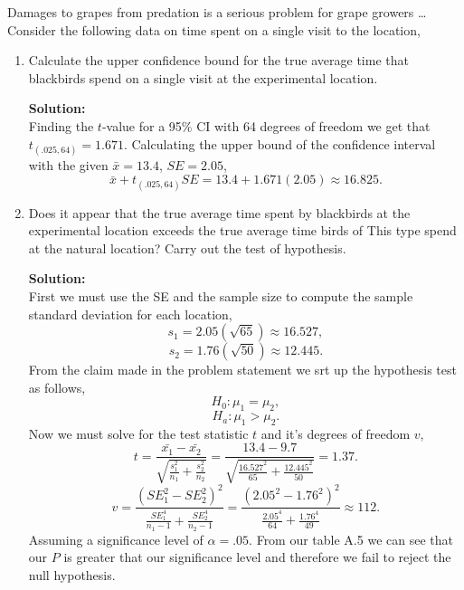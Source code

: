 \documentclass[12pt]{article}
\makeatletter
\theoremstyle{homework}
\newenvironment{exercise}[1]
{\def\@currentlabel{#1}\exercisecore}
{\endexercisecore}
\newcommand{\localhead}[1]{\par\smallskip\noindent\textbf{#1}\nobreak\\}%
\newcommand\solution{\localhead{Solution:}}
\makeatother
\begin{document}
\begin{exercise}{9.24} Damages to grapes from predation is a serious problem for grape growers \dots Consider the 
  following data on time spent on a single visit to the location,\\

  \begin{enumerate}
    \item Calculate the upper confidence bound for the true average time that blackbirds spend on a single visit at the 
    experimental location.\\
    \solution Finding the $t$-value for a 95\% CI with 64 degrees of freedom we get that $t_{(.025, 64)} = 1.671$. Calculating the upper bound of 
    the confidence interval with the given $\bar{x} = 13.4$, $SE = 2.05$,
    \begin{equation*}
      \bar{x} + t_{(.025, 64)}SE = 13.4 + 1.671(2.05) \approx 16.825. 
    \end{equation*}
    \vspace{.25in}


    \item Does it appear that the true average time spent by blackbirds at the experimental location exceeds the true average time birds of This
    type spend at the natural location? Carry out the test of hypothesis.\\
    \solution First we must use the SE and the sample size to compute the sample standard deviation for each location, 
    \begin{equation*}
      s_1 = 2.05(\sqrt{65}) \approx 16.527,
    \end{equation*}
    \begin{equation*}
      s_2 = 1.76(\sqrt{50}) \approx 12.445.
    \end{equation*}
    From the claim made in the problem statement we srt up the hypothesis test as follows,
    \begin{equation*}
      H_0:\mu_1 = \mu_2,
    \end{equation*}
    \begin{equation*}
      H_a:\mu_1 > \mu_2.
    \end{equation*}
    Now we must solve for the test statistic $t$ and it's degrees of freedom $v$,
    \begin{equation*}
      t = \dfrac{\bar{x_1} - \bar{x_2}}{\sqrt{\frac{s_1^2}{n_1} + \frac{s_2^2}{n_2}}} = \dfrac{13.4 - 9.7}{\sqrt{\frac{16.527^2}{65} + \frac{12.445^2}{50}}} = 1.37.
    \end{equation*}
    \begin{equation*}
      v = \dfrac{(SE_1^2 - SE_2^2)^2}{\frac{SE_1^4}{n_1-1}  + \frac{SE_2^4}{n_2 - 1}} = \dfrac{(2.05^2 - 1.76^2)^2}{\frac{2.05^4}{64}  + \frac{1.76^4}{49}} \approx 112. 
    \end{equation*}
    Assuming a significance level of $\alpha = .05$. From our table A.5 we can see that our $P$ is greater that our significance level and therefore we 
    fail to reject the null hypothesis. 
    \vspace{.25in}
  

\end{enumerate}
\end{exercise}
\end{document}
